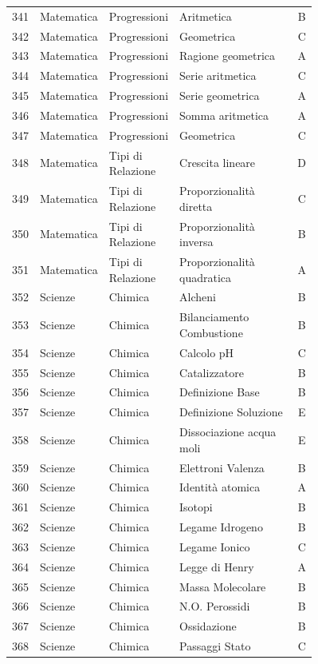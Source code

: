 \documentclass[20pt, a4paper]{article}
\begin{document}
\begin{longtable}{@{}r>{\raggedright\arraybackslash}p{0.14\linewidth}>{\raggedright\arraybackslash}p{0.20\linewidth}>{\raggedright\arraybackslash}p{0.42\linewidth}c@{}}
341 & Matematica & Progressioni & Aritmetica & B \\
342 & Matematica & Progressioni & Geometrica & C \\
343 & Matematica & Progressioni & Ragione geometrica & A \\
344 & Matematica & Progressioni & Serie aritmetica & C \\
345 & Matematica & Progressioni & Serie geometrica & A \\
346 & Matematica & Progressioni & Somma aritmetica & A \\
347 & Matematica & Progressioni & Geometrica & C \\
348 & Matematica & Tipi di Relazione & Crescita lineare & D \\
349 & Matematica & Tipi di Relazione & Proporzionalità diretta & C \\
350 & Matematica & Tipi di Relazione & Proporzionalità inversa & B \\
351 & Matematica & Tipi di Relazione & Proporzionalità quadratica & A \\
352 & Scienze & Chimica & Alcheni & B \\
353 & Scienze & Chimica & Bilanciamento Combustione & B \\
354 & Scienze & Chimica & Calcolo pH & C \\
355 & Scienze & Chimica & Catalizzatore & B \\
356 & Scienze & Chimica & Definizione Base & B \\
357 & Scienze & Chimica & Definizione Soluzione & E \\
358 & Scienze & Chimica & Dissociazione acqua moli & E \\
359 & Scienze & Chimica & Elettroni Valenza & B \\
360 & Scienze & Chimica & Identità atomica & A \\
361 & Scienze & Chimica & Isotopi & B \\
362 & Scienze & Chimica & Legame Idrogeno & B \\
363 & Scienze & Chimica & Legame Ionico & C \\
364 & Scienze & Chimica & Legge di Henry & A \\
365 & Scienze & Chimica & Massa Molecolare & B \\
366 & Scienze & Chimica & N.O. Perossidi & B \\
367 & Scienze & Chimica & Ossidazione & B \\
368 & Scienze & Chimica & Passaggi Stato & C \\

\end{longtable}
\end{document}
